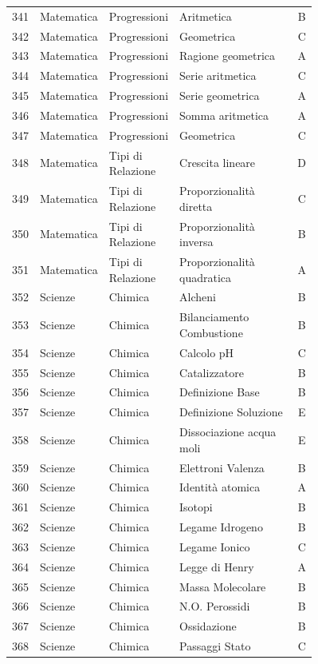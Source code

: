 \documentclass[20pt, a4paper]{article}
\begin{document}
\begin{longtable}{@{}r>{\raggedright\arraybackslash}p{0.14\linewidth}>{\raggedright\arraybackslash}p{0.20\linewidth}>{\raggedright\arraybackslash}p{0.42\linewidth}c@{}}
341 & Matematica & Progressioni & Aritmetica & B \\
342 & Matematica & Progressioni & Geometrica & C \\
343 & Matematica & Progressioni & Ragione geometrica & A \\
344 & Matematica & Progressioni & Serie aritmetica & C \\
345 & Matematica & Progressioni & Serie geometrica & A \\
346 & Matematica & Progressioni & Somma aritmetica & A \\
347 & Matematica & Progressioni & Geometrica & C \\
348 & Matematica & Tipi di Relazione & Crescita lineare & D \\
349 & Matematica & Tipi di Relazione & Proporzionalità diretta & C \\
350 & Matematica & Tipi di Relazione & Proporzionalità inversa & B \\
351 & Matematica & Tipi di Relazione & Proporzionalità quadratica & A \\
352 & Scienze & Chimica & Alcheni & B \\
353 & Scienze & Chimica & Bilanciamento Combustione & B \\
354 & Scienze & Chimica & Calcolo pH & C \\
355 & Scienze & Chimica & Catalizzatore & B \\
356 & Scienze & Chimica & Definizione Base & B \\
357 & Scienze & Chimica & Definizione Soluzione & E \\
358 & Scienze & Chimica & Dissociazione acqua moli & E \\
359 & Scienze & Chimica & Elettroni Valenza & B \\
360 & Scienze & Chimica & Identità atomica & A \\
361 & Scienze & Chimica & Isotopi & B \\
362 & Scienze & Chimica & Legame Idrogeno & B \\
363 & Scienze & Chimica & Legame Ionico & C \\
364 & Scienze & Chimica & Legge di Henry & A \\
365 & Scienze & Chimica & Massa Molecolare & B \\
366 & Scienze & Chimica & N.O. Perossidi & B \\
367 & Scienze & Chimica & Ossidazione & B \\
368 & Scienze & Chimica & Passaggi Stato & C \\

\end{longtable}
\end{document}
